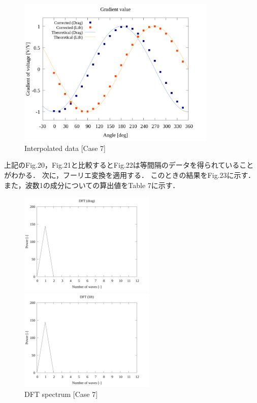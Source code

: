 \begin{figure}[htbp]
  \begin{center}
    \includegraphics[width=95mm]{../../02_workspace/result/simulation_tx=10.0_ty=-5.0_dx=5.00_dy=-2.50/plot/21/21-3_summary_interpolated.png}
    \caption{Interpolated data [Case 7]}
  \end{center}
\end{figure}

上記のFig.20，Fig.21と比較するとFig.22は等間隔のデータを得られていることがわかる．
次に，フーリエ変換を適用する．
このときの結果をFig.23に示す．
また，波数1の成分についての算出値をTable 7に示す．

\begin{figure}[htbp]
  \begin{minipage}[b]{0.45\linewidth}
    \centering
    \includegraphics[width=65mm]{../../02_workspace/result/simulation_tx=10.0_ty=-5.0_dx=5.00_dy=-2.50/plot/07/07-3_dft-drag.png}
  \end{minipage}
  \begin{minipage}[b]{0.45\linewidth}
    \centering
    \includegraphics[width=65mm]{../../02_workspace/result/simulation_tx=10.0_ty=-5.0_dx=5.00_dy=-2.50/plot/07/07-4_dft-lift.png}
  \end{minipage}
  \caption{DFT spectrum [Case 7]}
\end{figure}

